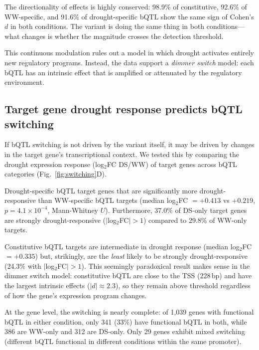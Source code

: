 \documentclass[10pt,letterpaper]{article}
\begin{document}
The directionality of effects is highly conserved: 98.9\% of constitutive,
92.6\% of WW-specific, and 91.6\% of drought-specific bQTL show the same
sign of Cohen's $d$ in both conditions. The variant is doing the same thing
in both conditions---what changes is whether the magnitude crosses the
detection threshold.

This continuous modulation rules out a model in which drought activates
entirely new regulatory programs. Instead, the data support a \emph{dimmer
switch} model: each bQTL has an intrinsic effect that is amplified or
attenuated by the regulatory environment.

\subsection*{Target gene drought response predicts bQTL switching}

If bQTL switching is not driven by the variant itself, it may be driven by
changes in the target gene's transcriptional context. We tested this by
comparing the drought expression response (log$_2$FC DS/WW) of target genes
across bQTL categories (Fig.~\ref{fig:switching}D).

Drought-specific bQTL target genes that are significantly more
drought-responsive than WW-specific bQTL targets (median log$_2$FC
$= +0.413$ vs $+0.219$, $p = 4.1 \times 10^{-4}$, Mann-Whitney $U$).
Furthermore, 37.0\% of DS-only target genes are strongly drought-responsive
($|$log$_2$FC$| > 1$) compared to 29.8\% of WW-only targets.

Constitutive bQTL targets are intermediate in drought response (median
log$_2$FC $= +0.335$) but, strikingly, are the \emph{least} likely to be
strongly drought-responsive (24.3\% with $|$log$_2$FC$| > 1$). This
seemingly paradoxical result makes sense in the dimmer switch model:
constitutive bQTL are close to the TSS (228\,bp) and have the largest
intrinsic effects ($|d| \approx 2.3$), so they remain above threshold
regardless of how the gene's expression program changes.

At the gene level, the switching is nearly complete: of 1,039 genes with
functional bQTL in either condition, only 341 (33\%) have functional bQTL
in both, while 386 are WW-only and 312 are DS-only. Only 29 genes exhibit
mixed switching (different bQTL functional in different conditions within
the same promoter).
\end{document}
